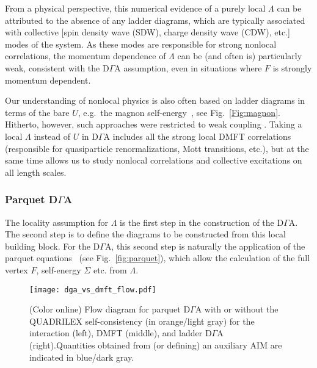 \documentclass[rmp,aps,reprint,amsmath,amssymb,superscriptaddress,showpacs,nofootinbib]{revtex4-1}
\begin{document}
From a physical perspective, this numerical evidence of a purely local $\Lambda$ can be attributed to the absence of any ladder diagrams, which are typically associated with collective [spin density wave (SDW), charge density wave (CDW), etc.] modes of the system. As these modes are responsible for strong nonlocal correlations, the momentum dependence of  $\Lambda$ can be (and often is) particularly weak, consistent with the D$\Gamma$A assumption, even in situations  where $F$ is strongly momentum dependent.

Our understanding of nonlocal physics is also often based on ladder diagrams in terms of the bare $U$, e.g.\ the magnon self-energy~\cite{Hertz1973}, see Fig.~\ref{Fig:magnon}. Hitherto, however, such approaches were restricted to weak coupling \cite{Vilk1997}. Taking a local  $\Lambda$ instead of $U$ in D$\Gamma$A includes all the strong local DMFT correlations (responsible for quasiparticle renormalizations, Mott transitions, etc.), but at the same time allows us to study nonlocal correlations and collective excitations on all length scales.

\subsubsection{Parquet  D\texorpdfstring{$\Gamma$}{G}A}
\label{sec:parquetDGA}

The locality assumption for $\Lambda$ is the first step in the construction of the D$\Gamma$A. The second step is to define the diagrams to be constructed from this local building block. For the D$\Gamma$A, this second step is naturally the application of the parquet equations~\cite{Toschi2007,Held2014} (see  Fig.~\ref{fig:parquet}), which allow the calculation of the full vertex $F$, self-energy $\Sigma$  etc. from $\Lambda$.

\begin{figure*}[t!]
  \texttt{[image: dga\_vs\_dmft\_flow.pdf]}
    \caption{(Color online) Flow diagram for parquet D$\Gamma$A with or without the QUADRILEX self-consistency (in orange/light gray) for the interaction  (left),  DMFT (middle), and   ladder D$\Gamma$A (right).Quantities obtained from (or defining) an auxiliary AIM are indicated in blue/dark gray.}
 \label{fig:dgaladderflow}
\end{figure*}
\end{document}

